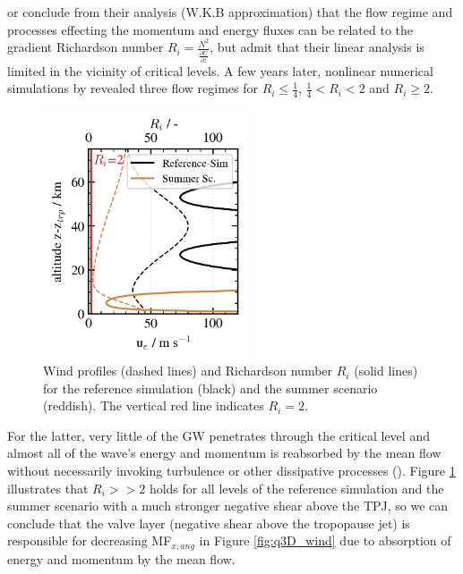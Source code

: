 \textcite[]{bretherton_propagation_1966} or \textcite[]{booker_critical_1967} conclude from their analysis (W.K.B approximation) that the flow regime and processes effecting the momentum and energy fluxes can be related to the gradient Richardson number $R_i=\frac{N^2}{\frac{\partial U}{\partial z}}$, but admit that their linear analysis is limited in the vicinity of critical levels. A few years later, nonlinear numerical simulations by \textcite[]{breeding_non-linear_1971} revealed three flow regimes for $R_i \leq \frac{1}{4}$, $\frac{1}{4} < R_i < 2$ and $R_i \geq 2$.
\begin{figure}
    \includegraphics[width=6cm]{figures_q3D/critical-layer-ana.png}
    \caption{Wind profiles (dashed lines) and Richardson number $R_i$ (solid lines) for the reference simulation (black) and the summer scenario (reddish). The vertical red line indicates $R_i=2$.}
    \label{fig:ri}
\end{figure}
For the latter, very little of the GW penetrates through the critical level and almost all of the wave's energy and momentum is reabsorbed by the mean flow without necessarily invoking turbulence or other dissipative processes (\cite[]{booker_critical_1967}). Figure \ref{fig:ri} illustrates that $R_i >> 2$ holds for all levels of the reference simulation and the summer scenario with a much stronger negative shear above the TPJ, so we can conclude that the valve layer (negative shear above the tropopause jet) is responsible for decreasing MF$_{x,ang}$ in Figure \ref{fig:q3D_wind} due to absorption of energy and momentum by the mean flow.  

